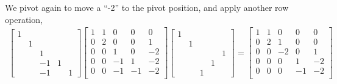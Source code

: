 \documentclass[10pt]{article}
\begin{document}
\begin{solution}[Solution]
\begin{enumerate}
    We pivot again to move a ``-2'' to the pivot position, and apply another row operation,
    {\footnotesize
    \begin{align*}
        \left[\begin{array}{rrrrr}
            1 \\
            & 1 \\
            & & 1 \\
            & & -1 & 1 \\
            & & -1 & & 1 
        \end{array}\right]
        \left[\begin{array}{ccccc}
            1 & 1 & 0 & 0 & 0 \\
            0 & 2 & 0 & 0 & 1 \\
            0 & 0 & 1 & 0 & -2 \\
            0 & 0 & -1 & 1 & -2 \\
            0 & 0 & -1 & -1 & -2 \\
        \end{array}\right]
        \left[\begin{array}{rrrrr}
            1 \\
            & 1 \\
            & & & & 1 \\
            & & & 1 \\
            & &  1 
       \end{array}\right]
        =
        \left[\begin{array}{ccccc}
            1 & 1 & 0 & 0 & 0 \\
            0 & 2 & 1 & 0 & 0 \\
            0 & 0 & -2 & 0 & 1 \\
            0 & 0 & 0 & 1 & -2 \\
            0 & 0 & 0 & -1 & -2 \\
        \end{array}\right]
    \end{align*}
    }




\end{enumerate}
\end{solution}
\end{document}
